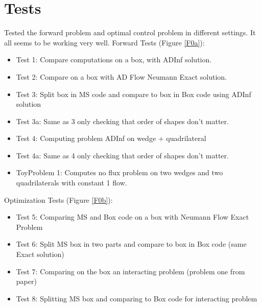 \documentclass[11pt, a4paper]{article}
\theoremstyle{definition}
\begin{document}
	\section{Tests}
	Tested the forward problem and optimal control problem in different settings. It all seems to be working very well. 
	Forward Tests (Figure \ref{F0a}):
	\begin{itemize}
		\item Test 1: Compare computations on a box, with ADInf solution.
		\item Test 2: Compare on a box with AD Flow Neumann Exact solution.
		\item Test 3: Split box in MS code and compare to box in Box code using ADInf solution
		\item Test 3a: Same as 3 only checking that order of shapes don't matter.
		\item Test 4: Computing problem ADInf on wedge + quadrilateral
		\item Test 4a: Same as 4 only checking that order of shapes don't matter.
		\item ToyProblem 1: Computes no flux problem on two wedges and two quadrilaterals with constant 1 flow.
	\end{itemize} 
	Optimization Tests (Figure \ref{F0b}):
	\begin{itemize}
		\item Test 5: Comparing MS and Box code on a box with Neumann Flow Exact Problem
		\item Test 6: Split MS box in two parts and compare to box in Box code (same Exact solution)
		\item Test 7: Comparing on the box an interacting problem (problem one from paper)
		\item Test 8: Splitting MS box and comparing to Box code for interacting problem
	\end{itemize}
\end{document}
